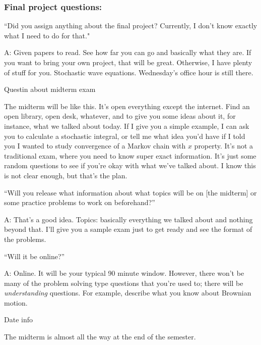 \subsubsection{Final project questions:}
\begin{quest}
	\item ``Did you assign anything about the final project? Currently, I don't know exactly what I need to do for that."
	\begin{ans}
		A: Given papers to read. See how far you can go and basically what they are. If you want to bring your own project,  that will be great. Otherwise, I have plenty of stuff for you. Stochastic wave equations. Wednesday's office hour is still there. 
	\end{ans}
	
	\item Questin about midterm exam 
	\begin{ans} The midterm will be like this. It's open everything except the internet. Find an open library, open desk, whatever, and to give you some ideas about it, for instance, what we talked about today. If I give you a simple example, I can ask you to calculate a stochastic integral, or tell me what idea you'd have if I told you I wanted to study convergence of a Markov chain with $x$ property. It's not a traditional exam, where you need to know super exact information. It's just some random questions to see if you're okay with what we've talked about. I know this is not clear enough, but that's the plan. 
	\end{ans}

	\item ``Will you release what information about what topics will be on [the midterm] or some practice problems to work on beforehand?''
	\begin{ans}
	A: That's a good idea. Topics: basically everything we talked about and nothing beyond that. I'll give you a sample exam just to get ready and see the format of the problems. 
	\end{ans}

	\item ``Will it be online?'' 
	\begin{ans}
	A: Online. It will be your typical 90 minute window. However, there won't be many of the problem solving type questions that you're used to; there will be \emph{understanding} questions. For example, describe what you know about Brownian motion. 
	\end{ans}

	\item Date info
	\begin{ans}
	The midterm is almost all the way at the end of the semester. 
	\end{ans}
\end{quest}
 
